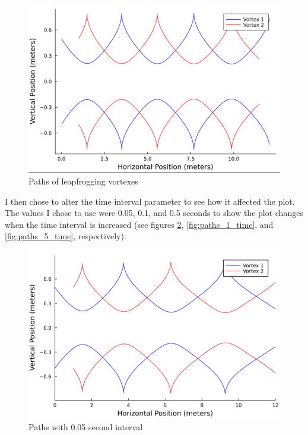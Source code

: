 \documentclass{article}
\begin{document}
\begin{figure}[ht]
\centering
\includegraphics[scale=0.75]{plots_1.1.4000.01.png}
\caption{Paths of leapfrogging vortexes}
\label{fig:paths_01_time}
\end{figure}

I then chose to alter the time interval parameter to see how it affected the plot. The values I chose to use were 0.05, 0.1, and 0.5 seconds to show the plot changes when the time interval is increased (see figures \ref{fig:paths_05_time}, \ref{fig:paths_1_time}, and \ref{fig:paths_5_time}, respectively).

\begin{figure}[ht]
\centering
\includegraphics[scale=.75]{plots_1.1.4000.05.png}
\caption{Paths with 0.05 second interval}
\label{fig:paths_05_time}
\end{figure}
\end{document}
